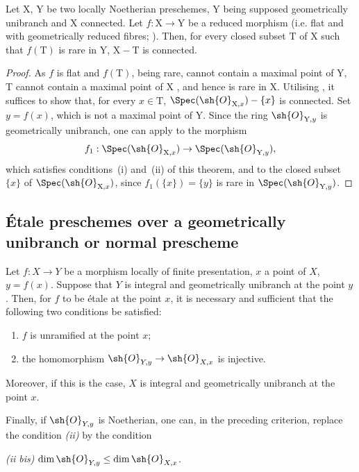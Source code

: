 \begin{corollary}[18.9.11]
\label{IV.18.9.11}
Let $\mathrm{X}$, $\mathrm{Y}$ be two locally Noetherian preschemes, $\mathrm{Y}$ being supposed geometrically unibranch and X connected.
Let $f:\mathrm{X}\to\mathrm{Y}$ be a reduced morphism (i.e. flat and with geometrically reduced fibres; ).
Then, for every closed subset $\mathrm{T}$ of $\mathrm{X}$ such that $f(\mathrm{T})$ is rare in $\mathrm{Y}$, $\mathrm{X}-\mathrm{T}$ is connected.
\end{corollary}

\begin{proof}
As $f$ is flat and $f(\mathrm{T})$, being rare, cannot contain a maximal point of Y, T cannot contain a maximal point of X , and hence is rare in X.
Utilising , it suffices to show that, for every $x\in\mathrm{T}$, $\Spec(\sh{O}_{\mathrm{X},x})-\{x\}$ is connected.
Set $y=f(x)$, which is not a maximal point of Y.
Since the ring $\sh{O}_{\mathrm{Y},y}$ is geometrically unibranch, one can apply  to the morphism
\[
  f_1:\Spec(\sh{O}_{\mathrm{X},x})\to\Spec(\sh{O}_{\mathrm{Y},y}),
\]
which satisfies conditions~(i) and~(ii) of this theorem, and to the closed subset $\{x\}$ of $\Spec(\sh{O}_{\mathrm{X},x})$, since $f_1(\{x\})=\{y\}$ is rare in $\Spec(\sh{O}_{\mathrm{Y},y})$.
\end{proof}
\subsection{\'Etale preschemes over a geometrically unibranch or normal prescheme}
\label{subsection:IV.18.10}

\begin{theorem}[18.10.1]
\label{IV.18.10.1}
Let $f:X\to Y$ be a morphism locally of finite presentation, $x$ a point of $X$, $y=f(x)$.
Suppose that $Y$ is integral and geometrically unibranch at the point $y$.
Then, for $f$ to be \'etale at the point $x$, it is necessary and sufficient that the following two conditions be satisfied:
\begin{enumerate}[label=\emph{\roman*)}]
  \item $f$ is unramified at the point $x$;
  \item the homomorphism $\sh{O}_{Y,y}\to\sh{O}_{X,x}$ is injective.
\end{enumerate}

Moreover, if this is the case, $X$ is integral and geometrically unibranch at the point $x$.

Finally, if $\sh{O}_{Y,y}$ is Noetherian, one can, in the preceding criterion, replace the condition \emph{(ii)} by the condition

\emph{(ii bis)} $\dim\sh{O}_{Y,y}\leq\dim\sh{O}_{X,x}$.
\end{theorem}

